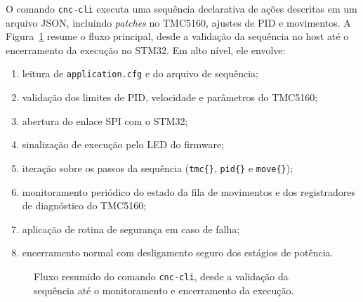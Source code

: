 O comando \texttt{cnc-cli} executa uma sequ\^encia declarativa de a\c{c}\~oes
descritas em um arquivo JSON, incluindo \emph{patches} no TMC5160,
ajustes de PID e movimentos. A Figura~\ref{fig:fluxo-cnc-cli} resume o
fluxo principal, desde a valida\c{c}\~ao da sequ\^encia no host at\'e o
encerramento da execu\c{c}\~ao no STM32. Em alto n\'ivel, ele envolve:
\begin{enumerate}
\item leitura de \texttt{application.cfg} e do arquivo de sequ\^encia;
\item valida\c{c}\~ao dos limites de PID, velocidade e par\^ametros do
  TMC5160;
\item abertura do enlace SPI com o STM32;
\item sinaliza\c{c}\~ao de execu\c{c}\~ao pelo LED do firmware;
\item itera\c{c}\~ao sobre os passos da sequ\^encia
  (\texttt{tmc\{\}}, \texttt{pid\{\}} e \texttt{move\{\}});
\item monitoramento peri\'odico do estado da fila de movimentos e dos
  registradores de diagn\'ostico do TMC5160;
\item aplica\c{c}\~ao de rotina de seguran\c{c}a em caso de falha;
\item encerramento normal com desligamento seguro dos est\'agios de
  pot\^encia.
\end{enumerate}

\begin{figure}[H]
    \centering
    \caption{Fluxo resumido do comando \texttt{cnc-cli}, desde a valida\c{c}\~ao da sequ\^encia at\'e o monitoramento e encerramento da execu\c{c}\~ao.}
    \label{fig:fluxo-cnc-cli}
\end{figure}

